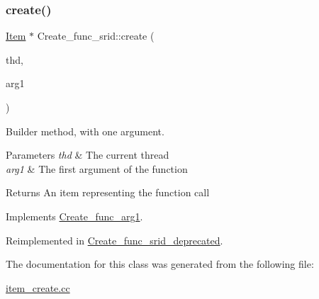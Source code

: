 \subsubsection{\texorpdfstring{create()}{create()}}
{\footnotesize\ttfamily \mbox{\hyperlink{classItem}{Item}} $\ast$ Create\+\_\+func\+\_\+srid\+::create (\begin{DoxyParamCaption}\item[{T\+HD $\ast$}]{thd,  }\item[{\mbox{\hyperlink{classItem}{Item}} $\ast$}]{arg1 }\end{DoxyParamCaption})\hspace{0.3cm}{\ttfamily [virtual]}}

Builder method, with one argument. 
\begin{DoxyParams}{Parameters}
{\em thd} & The current thread \\
\hline
{\em arg1} & The first argument of the function \\
\hline
\end{DoxyParams}
\begin{DoxyReturn}{Returns}
An item representing the function call 
\end{DoxyReturn}


Implements \mbox{\hyperlink{classCreate__func__arg1_a3e9a98f755cd82c3e762e334c955a8c9}{Create\+\_\+func\+\_\+arg1}}.



Reimplemented in \mbox{\hyperlink{classCreate__func__srid__deprecated_aab48858db4cb1dc7a693b7f1d18939ac}{Create\+\_\+func\+\_\+srid\+\_\+deprecated}}.



The documentation for this class was generated from the following file\+:\begin{DoxyCompactItemize}
\item 
\mbox{\hyperlink{item__create_8cc}{item\+\_\+create.\+cc}}\end{DoxyCompactItemize}
